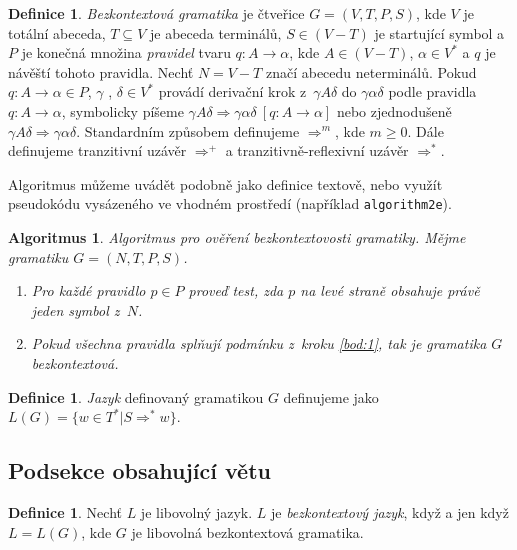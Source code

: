 \documentclass[a4paper, 11pt]{article}
\theoremstyle{plain}
\theoremstyle{definition}
\newtheorem{definice}[noreset]{Definice}
\theoremstyle{plain}
\newtheorem{algoritmus}[noreset]{Algoritmus}
\begin{document}
\begin{definice}\label{definice:1}
\emph{Bezkontextová gramatika} je čtveřice $G = (V,T,P,S)$, kde $V$ je totální abeceda, $T \subseteq V$ je abeceda terminálů, $S \in (V-T)$ je startující symbol a $P$ je konečná množina \emph{pravidel} tvaru $q\!: A\to \alpha$, kde $A \in (V-T)$, $\alpha \in V^*$ a $q$ je návěští tohoto pravidla.
Nechť $N = V - T$ značí abecedu neterminálů.
Pokud $q\!: A\to \alpha \in P$, $\gamma$ , $\delta \in V^*$ provádí derivační krok z~${\gamma}A\delta$ do $\gamma\alpha\delta$ podle pravidla $q\!: A\to \alpha$, symbolicky píšeme ${\gamma}A\delta \Rightarrow  \gamma\alpha\delta\ [q\!: A \to \alpha]$ nebo zjednodušeně ${\gamma}A\delta \Rightarrow \gamma\alpha\delta$.
Standardním způsobem definujeme $\Rightarrow^m$, kde $m \geq 0$.
Dále definujeme tranzitivní uzávěr $\Rightarrow^+$ a tranzitivně-reflexivní uzávěr $\Rightarrow^*$.
\end{definice}

Algoritmus můžeme uvádět podobně jako definice textově, nebo využít pseudokódu vysázeného ve vhodném prostředí (například \verb|algorithm2e|).

\begin{algoritmus}
Algoritmus pro ověření bezkontextovosti gramatiky. Mějme gramatiku $G = (N, T, P, S)$.
\begin{enumerate}
  \item\label{bod:1} Pro každé pravidlo $p \in P$ proveď test, zda $p$ na levé straně obsahuje právě jeden symbol z~$N$.
  \item Pokud všechna pravidla splňují podmínku z~kroku \ref{bod:1}, tak je gramatika $G$ bezkontextová.
\end{enumerate}
\end{algoritmus}

\begin{definice}
\emph{Jazyk} definovaný gramatikou $G$ definujeme jako $L(G) = \{w \in T^* | S \Rightarrow^* w\}$.
\end{definice}

\subsection{Podsekce obsahující větu}

\begin{definice}
Nechť $L$ je libovolný jazyk. $L$ je \emph{bezkontextový jazyk}, když a jen když $L = L(G)$, kde $G$ je libovolná bezkontextová gramatika.
\end{definice}
\end{document}
